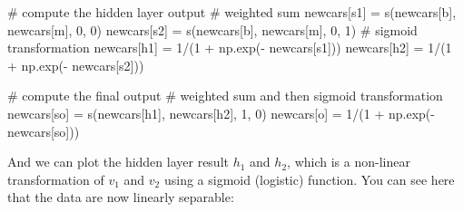 \documentclass[
  letterpaper,
]{scrbook}
\newenvironment{Shaded}{\begin{snugshade}}{\end{snugshade}}
\newcommand{\CommentTok}[1]{\textcolor[rgb]{0.37,0.37,0.37}{#1}}
\newcommand{\DecValTok}[1]{\textcolor[rgb]{0.68,0.00,0.00}{#1}}
\newcommand{\NormalTok}[1]{\textcolor[rgb]{0.00,0.23,0.31}{#1}}
\newcommand{\OperatorTok}[1]{\textcolor[rgb]{0.37,0.37,0.37}{#1}}
\newcommand{\StringTok}[1]{\textcolor[rgb]{0.13,0.47,0.30}{#1}}
\begin{document}
\begin{Shaded}
\begin{Highlighting}[]
\CommentTok{\# compute the hidden layer output}
\CommentTok{\# weighted sum}
\NormalTok{newcars[}\StringTok{\textquotesingle{}s1\textquotesingle{}}\NormalTok{] }\OperatorTok{=}\NormalTok{ s(newcars[}\StringTok{\textquotesingle{}b\textquotesingle{}}\NormalTok{], newcars[}\StringTok{\textquotesingle{}m\textquotesingle{}}\NormalTok{], }\DecValTok{0}\NormalTok{, }\DecValTok{0}\NormalTok{)}
\NormalTok{newcars[}\StringTok{\textquotesingle{}s2\textquotesingle{}}\NormalTok{] }\OperatorTok{=}\NormalTok{ s(newcars[}\StringTok{\textquotesingle{}b\textquotesingle{}}\NormalTok{], newcars[}\StringTok{\textquotesingle{}m\textquotesingle{}}\NormalTok{], }\DecValTok{0}\NormalTok{, }\DecValTok{1}\NormalTok{)}
\CommentTok{\# sigmoid transformation}
\NormalTok{newcars[}\StringTok{\textquotesingle{}h1\textquotesingle{}}\NormalTok{] }\OperatorTok{=} \DecValTok{1}\OperatorTok{/}\NormalTok{(}\DecValTok{1} \OperatorTok{+}\NormalTok{ np.exp(}\OperatorTok{{-}}\NormalTok{ newcars[}\StringTok{\textquotesingle{}s1\textquotesingle{}}\NormalTok{])) }
\NormalTok{newcars[}\StringTok{\textquotesingle{}h2\textquotesingle{}}\NormalTok{] }\OperatorTok{=} \DecValTok{1}\OperatorTok{/}\NormalTok{(}\DecValTok{1} \OperatorTok{+}\NormalTok{ np.exp(}\OperatorTok{{-}}\NormalTok{ newcars[}\StringTok{\textquotesingle{}s2\textquotesingle{}}\NormalTok{])) }

\CommentTok{\# compute the final output}
\CommentTok{\# weighted sum and then sigmoid transformation}
\NormalTok{newcars[}\StringTok{\textquotesingle{}so\textquotesingle{}}\NormalTok{] }\OperatorTok{=}\NormalTok{ s(newcars[}\StringTok{\textquotesingle{}h1\textquotesingle{}}\NormalTok{], newcars[}\StringTok{\textquotesingle{}h2\textquotesingle{}}\NormalTok{], }\DecValTok{1}\NormalTok{, }\DecValTok{0}\NormalTok{)}
\NormalTok{newcars[}\StringTok{\textquotesingle{}o\textquotesingle{}}\NormalTok{] }\OperatorTok{=} \DecValTok{1}\OperatorTok{/}\NormalTok{(}\DecValTok{1} \OperatorTok{+}\NormalTok{ np.exp(}\OperatorTok{{-}}\NormalTok{ newcars[}\StringTok{\textquotesingle{}so\textquotesingle{}}\NormalTok{]))}
\end{Highlighting}
\end{Shaded}

And we can plot the hidden layer result \(h_1\) and \(h_2\), which is a
non-linear transformation of \(v_1\) and \(v_2\) using a sigmoid
(logistic) function. You can see here that the data are now linearly
separable:
\end{document}

